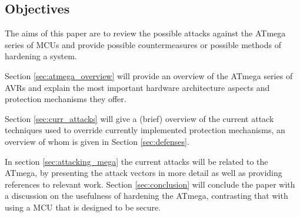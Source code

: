 	\subsection{Objectives}
	The aims of this paper are to review the possible attacks against the ATmega series of MCUs and provide possible countermeasures or possible methods of hardening a system. 
	
	Section \ref{sec:atmega_overview} will provide an overview of the ATmega series of AVRs and explain the most important hardware architecture aspects and protection mechanisms they offer. 
	
	Section \ref{sec:curr_attacks} will give a (brief) overview of the current attack techniques used to override currently implemented protection mechanisms, an overview of whom is given in Section \ref{sec:defenses}. 
	
	In section \ref{sec:attacking_mega} the current attacks will be related to the ATmega, by presenting the attack vectors in more detail as well as providing references to relevant work. Section \ref{sec:conclusion} will conclude the paper with a discussion on the usefulness of hardening the ATmega, contrasting that with using a MCU that is designed to be secure.